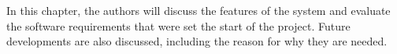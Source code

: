 In this chapter, the authors will discuss the features of the system and evaluate the software requirements
that were set the start of the project.
Future developments are also discussed, including the reason for why they are needed.
